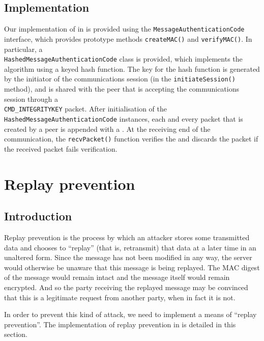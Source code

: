 \documentclass[a4paper,11pt]{article}
\begin{document}
\subsection{Implementation}
Our implementation of  in \packageName{}
is provided using the \verb+MessageAuthenticationCode+ interface, which provides
prototype methods \verb+createMAC()+ and \verb+verifyMAC()+. In particular, a \\ 
\verb+HashedMessageAuthenticationCode+ class is provided, which implements the
 algorithm using a keyed  
hash function. The key for the hash function is generated by the initiator of 
the communications session (in the \verb+initiateSession()+ method), and is 
shared with the peer that is accepting the communications session through a \\
\verb+CMD_INTEGRITYKEY+ packet. After initialisation of the \\
\verb+HashedMessageAuthenticationCode+ instances, each and every packet that is
created by a peer is appended with a . 
At the receiving end of the communication, the \verb+recvPacket()+ function 
verifies the  and discards the packet if
the received packet fails verification.

\section{Replay prevention}

\subsection{Introduction}
Replay prevention is the process by which an attacker stores some transmitted 
data and chooses to ``replay'' (that is, retransmit) that data at a later time 
in an unaltered form. Since the message has not been modified in any way, the 
server would otherwise be unaware that this message is being replayed. The MAC
digest of the message would remain intact and the message itself would remain
encrypted. And so the party receiving the replayed message may be convinced that
this is a legitimate request from another party, when in fact it is not.

In order to prevent this kind of attack, we need to implement a means of 
``replay prevention''. The implementation of replay prevention in \packageName{}
is detailed in this section.
\end{document}
